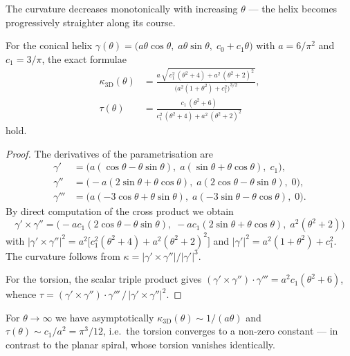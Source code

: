 The curvature decreases monotonically with increasing $\theta$ --- the helix
becomes progressively straighter along its course.

\begin{theorem}\label{thm:3d-curvature-torsion}
For the conical helix $\gamma(\theta) = \bigl(a\theta\cos\theta,\;
a\theta\sin\theta,\; c_0 + c_1\theta\bigr)$ with $a = 6/\pi^2$ and
$c_1 = 3/\pi$, the exact formulae
\begin{align}
\kappa_{\mathrm{3D}}(\theta)
  &= \frac{a\,\sqrt{\,c_1^2\,(\theta^2+4) + a^2\,(\theta^2+2)^2\,}}
          {\bigl(a^2(1+\theta^2) + c_1^2\bigr)^{3/2}},
\label{eq:kappa3d}\\[6pt]
\tau(\theta)
  &= \frac{c_1\,(\theta^2 + 6)}
          {c_1^2\,(\theta^2+4) + a^2\,(\theta^2+2)^2}
\label{eq:torsion}
\end{align}
hold.
\end{theorem}

\begin{proof}
The derivatives of the parametrisation are
\begin{align*}
\gamma'  &= \bigl(a(\cos\theta - \theta\sin\theta),\;
             a(\sin\theta + \theta\cos\theta),\; c_1\bigr),\\
\gamma'' &= \bigl(-a(2\sin\theta + \theta\cos\theta),\;
             a(2\cos\theta - \theta\sin\theta),\; 0\bigr),\\
\gamma'''&= \bigl(a(-3\cos\theta + \theta\sin\theta),\;
             a(-3\sin\theta - \theta\cos\theta),\; 0\bigr).
\end{align*}
By direct computation of the cross product we obtain
\[
  \gamma' \times \gamma''
  = \bigl(-ac_1(2\cos\theta - \theta\sin\theta),\;
          -ac_1(2\sin\theta + \theta\cos\theta),\;
          a^2(\theta^2+2)\bigr)
\]
with $|\gamma' \times \gamma''|^2 = a^2\bigl[c_1^2(\theta^2+4) +
a^2(\theta^2+2)^2\bigr]$ and $|\gamma'|^2 = a^2(1+\theta^2) + c_1^2$.
The curvature follows from $\kappa = |\gamma' \times \gamma''|/|\gamma'|^3$.

For the torsion, the scalar triple product gives
$(\gamma' \times \gamma'') \cdot \gamma''' = a^2 c_1(\theta^2+6)$,
whence $\tau = (\gamma' \times \gamma'') \cdot \gamma''' \,/\,
|\gamma' \times \gamma''|^2$.
\end{proof}

\begin{remark}\label{rem:asymptotic-torsion}
For $\theta \to \infty$ we have asymptotically
$\kappa_{\mathrm{3D}}(\theta) \sim 1/(a\theta)$ and
$\tau(\theta) \sim c_1/a^2 = \pi^3/12$, i.e.\ the torsion converges to
a non-zero constant --- in contrast to the planar spiral, whose torsion
vanishes identically.
\end{remark}


